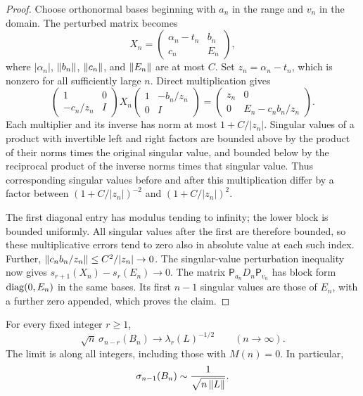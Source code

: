 \begin{proof}
Choose orthonormal bases beginning with $a_n$ in the range and $v_n$ in the domain. The perturbed matrix becomes
\[
 X_n=\begin{pmatrix}\alpha_n-t_n&b_n\\c_n&E_n\end{pmatrix},
\]
where $|\alpha_n|$, $\left\lVert b_n\right\rVert$, $\left\lVert c_n\right\rVert$, and $\left\lVert E_n\right\rVert$ are at most $C$. Set $z_n=\alpha_n-t_n$, which is nonzero for all sufficiently large $n$. Direct multiplication gives
\[
 \begin{pmatrix}1&0\\-c_n/z_n&I\end{pmatrix}
 X_n
 \begin{pmatrix}1&-b_n/z_n\\0&I\end{pmatrix}
 =\begin{pmatrix}z_n&0\\0&E_n-c_nb_n/z_n\end{pmatrix}.
\]
Each multiplier and its inverse has norm at most $1+C/|z_n|$. Singular values of a product with invertible left and right factors are bounded above by the product of their norms times the original singular value, and bounded below by the reciprocal product of the inverse norms times that singular value. Thus corresponding singular values before and after this multiplication differ by a factor between $(1+C/|z_n|)^{-2}$ and $(1+C/|z_n|)^2$.

The first diagonal entry has modulus tending to infinity; the lower block is bounded uniformly. All singular values after the first are therefore bounded, so these multiplicative errors tend to zero also in absolute value at each such index. Further,
$\left\lVert c_nb_n/z_n\right\rVert\le C^2/|z_n|\to0$. The singular-value perturbation inequality now gives
$s_{r+1}(X_n)-s_r(E_n)\to0$. The matrix $\mathsf P_{a_n}D_n\mathsf P_{v_n}$ has block form $\operatorname{diag}(0,E_n)$ in the same bases. Its first $n-1$ singular values are those of $E_n$, with a further zero appended, which proves the claim.
\end{proof}

\begin{theorem}\label{spec:bottom}
For every fixed integer $r\ge1$,
\begin{equation}\label{spec:bottomlimit}
 \sqrt n\,\sigma_{n-r}(B_n)\longrightarrow\lambda_r(L)^{-1/2}
 \qquad(n\to\infty).
\end{equation}
The limit is along all integers, including those with $M(n)=0$. In particular,
\[
 \sigma_{n-1}(B_n)\sim\frac1{\sqrt{n\left\lVert L\right\rVert}}.
\]
\end{theorem}

